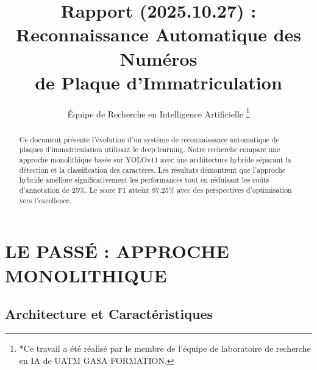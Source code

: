 \documentclass[letterpaper, 10 pt, conference]{ieeeconf}  %
\title{\LARGE \bf
Rapport (2025.10.27) : Reconnaissance Automatique des Numéros \\de Plaque
d'Immatriculation
}
\author{Équipe de Recherche en Intelligence Artificielle%
\thanks{*Ce travail a été réalisé par le membre de l'équipe de laboratoire
de recherche en IA de UATM GASA FORMATION. }%
}
\begin{document}
\maketitle
\thispagestyle{empty}
\pagestyle{empty}

\begin{abstract}

Ce document présente l'évolution d'un système de reconnaissance automatique
de plaques d'immatriculation utilisant le deep learning.
Notre recherche compare une approche monolithique basée sur YOLOv11
avec une architecture hybride séparant la détection et la classification
des caractères. Les résultats démontrent que l'approche hybride améliore
significativement les performances tout en réduisant les coûts d'annotation
de 25\%. Le score F1 atteint 97.25\% avec des perspectives d'optimisation
vers l'excellence.

\end{abstract}




\section{LE PASSÉ : APPROCHE MONOLITHIQUE}

\subsection{Architecture et Caractéristiques}
\end{document}
